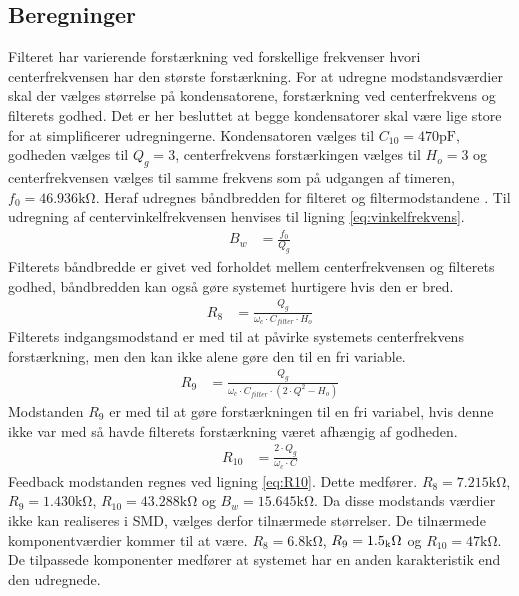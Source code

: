 \subsection{Beregninger}
Filteret har varierende forstærkning ved forskellige frekvenser hvori centerfrekvensen har den største forstærkning. For at udregne modstandsværdier skal der vælges størrelse på kondensatorene, forstærkning ved centerfrekvens og filterets godhed.
Det er her besluttet at begge kondensatorer skal være lige store for at simplificerer udregningerne.
Kondensatoren vælges til $C_{10} = 470 \si{\pico\farad}$, godheden vælges til $Q_g = 3$, centerfrekvens forstærkingen vælges til $H_o = 3$ og centerfrekvensen vælges til samme frekvens som på udgangen af timeren, $f_0 = 46.936 \si{\kilo\ohm}$.
Heraf udregnes båndbredden for filteret og filtermodstandene \cite[Side. 209]{Huelsman1993}.
Til udregning af centervinkelfrekvensen henvises til ligning \ref{eq:vinkelfrekvens}.
\begin{align}
	B_w & = \frac{f_0}{Q_g}
	\end{align}
Filterets båndbredde er givet ved forholdet mellem centerfrekvensen og filterets godhed, båndbredden kan også gøre systemet hurtigere hvis den er bred.
\begin{align}
	R_8 & = \frac{Q_g}{\omega_c \cdot C_{filter} \cdot H_o } \label{eq:R8}
	\end{align}
Filterets indgangsmodstand er med til at påvirke systemets centerfrekvens forstærkning, men den kan ikke alene gøre den til en fri variable. 
\begin{align}
	R_9 & = \frac{Q_g}{ \omega_c \cdot C_{filter} \cdot \left( 2 \cdot Q^2 - H_o \right) } \label{eq:R9}
	\end{align}
Modstanden $R_9$ er med til at gøre forstærkningen til en fri variabel, hvis denne ikke var med så havde filterets forstærkning været afhængig af godheden.
\begin{align}
	R_{10} & = \frac{2 \cdot Q_g}{ \omega_c \cdot C} \label{eq:R10}
\end{align}
Feedback modstanden regnes ved ligning \ref{eq:R10}.
Dette medfører. $R_8 = 7.215 \si{\kilo\ohm}$, $R_9 = 1.430 \si{\kilo\ohm}$, $R_{10} = 43.288 \si{\kilo\ohm}$ og $B_w = 15.645 \si{\kilo\ohm}$.
Da disse modstands værdier ikke kan realiseres i SMD, vælges derfor tilnærmede størrelser.
De tilnærmede komponentværdier kommer til at være. $R_8 = 6.8 \si{\kilo\ohm}$, $R_9 = 1.5 \si{_\kilo\ohm}$ og $R_{10} = 47 \si{\kilo\ohm}$.
De tilpassede komponenter medfører at systemet har en anden karakteristik end den udregnede. 

